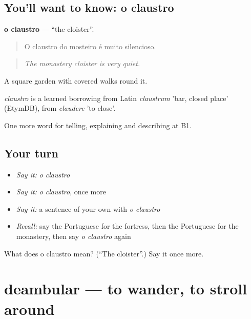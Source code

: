 \subsection*{You'll want to know: o claustro}
\textbf{o claustro} — \textquotedblleft{}the cloister\textquotedblright{}.

\begin{quote}
O claustro do mosteiro é muito silencioso.
\end{quote}

\begin{quote}
\emph{The monastery cloister is very quiet.}
\end{quote}

A square garden with covered walks round it.

\begin{cousinweb}
\emph{claustro} is a learned borrowing from Latin \emph{claustrum} 'bar, closed place' (EtymDB), from \emph{claudere} 'to close'.
\end{cousinweb}

\begin{grammarlens}[title={What you've built}]
One more word for telling, explaining and describing at B1.
\end{grammarlens}

\subsection*{Your turn}
\begin{itemize}
\raggedright
  \item \emph{Say it:} \emph{o claustro}
  \item \emph{Say it:} \emph{o claustro}, once more
  \item \emph{Say it:} a sentence of your own with \emph{o claustro}
  \item \emph{Recall:} say the Portuguese for the fortress, then the Portuguese for the monastery, then say \emph{o claustro} again
\end{itemize}

\begin{tcolorbox}[breakable,colback=teal!4,colframe=teal!35!black,title={Before you move on}]
What does o claustro mean? (\textquotedblleft{}The cloister\textquotedblright{}.) Say it once more.
\end{tcolorbox}
\section[deambular]{deambular — to wander, to stroll around}

